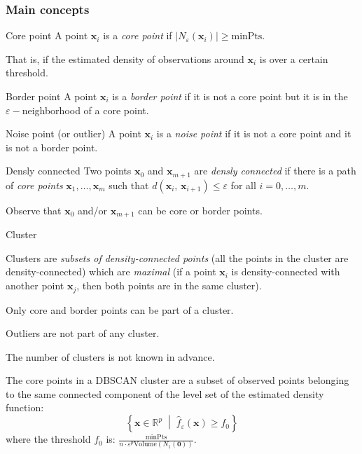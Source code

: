 \subsubsection{Main concepts}
\begin{definition}{Core point}{}
	A point $\boldsymbol{x}_i$ is a \emph{core point} if $|N_{\varepsilon}(\boldsymbol{x}_i)| \geq \text{minPts}$.

	That is, if the estimated density of observations around $\boldsymbol{x}_i$ is over a certain threshold.
\end{definition}

\begin{definition}{Border point}{}
	A point $\boldsymbol{x}_i$ is a \emph{border point} if it is not a core point but it is
	in the $\varepsilon-$neighborhood of a core point.
\end{definition}

\begin{definition}{Noise point (or outlier)}{}
	A point $\boldsymbol{x}_i$ is a \emph{noise point} if it is not a core point and it is not a border point.
\end{definition}

\begin{definition}{Densly connected}{}
	Two points $\boldsymbol{x}_0$ and $\boldsymbol{x}_{m+1}$ are \emph{densly connected} if
	there is a path of \emph{core points} $\boldsymbol{x}_1, \ldots, \boldsymbol{x}_{m}$ such
	that $d(\boldsymbol{x}_i,\,\boldsymbol{x}_{i+1}) \leq \varepsilon$ for all $i = 0, \ldots, m$.

	\tcblower
	Observe that $\boldsymbol{x}_0$ and/or $\boldsymbol{x}_{m+1}$ can be core or border points.
\end{definition}

\begin{definition}{Cluster}{}

	Clusters are \emph{subsets of density-connected points} (all the points in the cluster are
	density-connected) which are \emph{maximal} (if a point $\boldsymbol{x}_i$ is density-connected
	with another point $\boldsymbol{x}_j$, then both points are in the same cluster).

	\tcblower

	Only core and border points can be part of a cluster.

	Outliers are not part of any cluster.

	The number of clusters is not known in advance.

	The core points in a DBSCAN cluster are a subset of observed points belonging to the same
	connected component of the level set of the estimated density function:
	\begin{equation*}
		\left\{
		\boldsymbol x \in \mathds{R}^p \;\middle|\; \hat{f}_\varepsilon(\boldsymbol x) \geq f_0
		\right\}
	\end{equation*}
	where the threshold $f_0$ is: $\frac{\text{minPts}}{n \cdot \varepsilon^p \text{Volume}(N_{1}(\boldsymbol{0}))}$.

\end{definition}

